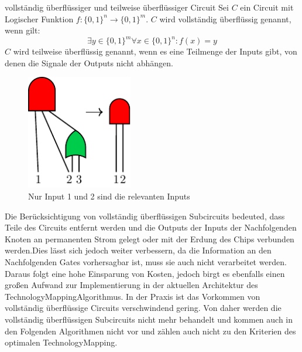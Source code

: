 \documentclass[11pt, a4paper, german]{article}
\newcommand{\TM}{TechnologyMapping}
\begin{document}
 \begin{definition}{vollständig überflüssiger und teilweise überflüssiger Circuit }
 	Sei $C$ ein Circuit mit Logischer Funktion $ f : \{ 0 , 1 \}^n \rightarrow \{ 0 , 1 \}^m $. $C$ wird vollständig überflüssig genannt, wenn gilt:
 	\[  \exists y \in \{0,1 \}^m \forall x \in \{ 0, 1\}^n : f(x) = y  \]
 	$C$ wird teilweise überflüssig genannt, wenn es eine Teilmenge der Inputs gibt, von denen die Signale der Outputs nicht abhängen.
 \end{definition}
 \begin{figure}
		\includegraphics[height = 5cm]{pictures/compiled/partly_redundant}
		\caption{Nur Input 1 und 2 sind die relevanten Inputs}
		\label{bild:partly_redundant}
\end{figure}
Die Berücksichtigung von vollständig überflüssigen Subcircuits bedeuted, dass Teile des Circuits entfernt werden und die Outputs der Inputs der Nachfolgenden Knoten an permanenten Strom gelegt oder mit der Erdung des Chips verbunden werden.Dies lässt sich jedoch weiter verbessern, da die Information an den Nachfolgenden Gates vorhersagbar ist, muss sie auch nicht verarbeitet werden. Daraus folgt eine hohe Einsparung von Kosten, jedoch birgt es ebenfalls einen großen Aufwand zur Implementierung in der aktuellen Architektur des \TM Algorithmus. In der Praxis ist das Vorkommen von  vollständig überflüssige Circuits verschwindend gering. Von daher werden die vollständig überflüssigen Subcircuits nicht mehr behandelt und kommen auch in den Folgenden Algorithmen nicht vor und zählen auch nicht zu den Kriterien des optimalen \TM. \\
 
\end{document}
